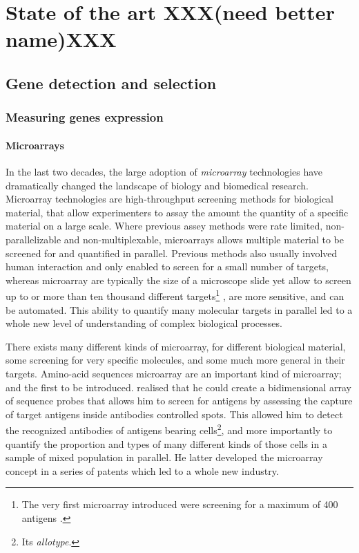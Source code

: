 \chapter{State of the art  XXX(need better name)XXX}
\label{chap:state}

\section{Gene detection and selection}

	\subsection{Measuring genes expression}

	\subsubsection{Microarrays}

	In the last two decades, the large adoption of \emph{microarray} technologies have dramatically changed the landscape of biology and biomedical research.
	Microarray technologies are high-throughput screening methods for biological material, that allow experimenters to assay the amount the quantity of a specific material on a large scale.
	Where previous assey methods were rate limited, non-parallelizable and non-multiplexable, microarrays allows multiple material to be screened for and quantified in parallel.
	Previous methods also usually involved human interaction and only enabled to screen for a small number of targets, whereas microarray are typically the size of a microscope slide yet allow to screen up to or more than ten thousand different targets\footnote{The very first microarray introduced were screening for a maximum of 400 antigens \parencite{chang1983binding}.} \parencites{smyth2005use}{sealfon2011rna}, are more sensitive, and can be automated.
	This ability to quantify many molecular targets in parallel led to a whole new level of understanding of complex biological processes.

	There exists many different kinds of microarray, for different biological material, some screening for very specific molecules, and some much more general in their targets.
	Amino-acid sequences microarray are an important kind of microarray; and the first to be introduced.
	\Textcite{chang1983binding} realised that he could create a bidimensional array of sequence probes that allows him to screen for antigens by assessing the capture of target antigens inside antibodies controlled spots.
	This allowed him to detect the recognized antibodies of antigens bearing cells\footnote{Its \emph{allotype}.}, and more importantly to quantify the proportion and types of many different kinds of those cells in a sample of mixed population in parallel.
	He latter developed the microarray concept in a series of patents \parencites{chang1986matrix}{chang1989immunoassay}{chang1992antibody} which led to a whole new industry.

